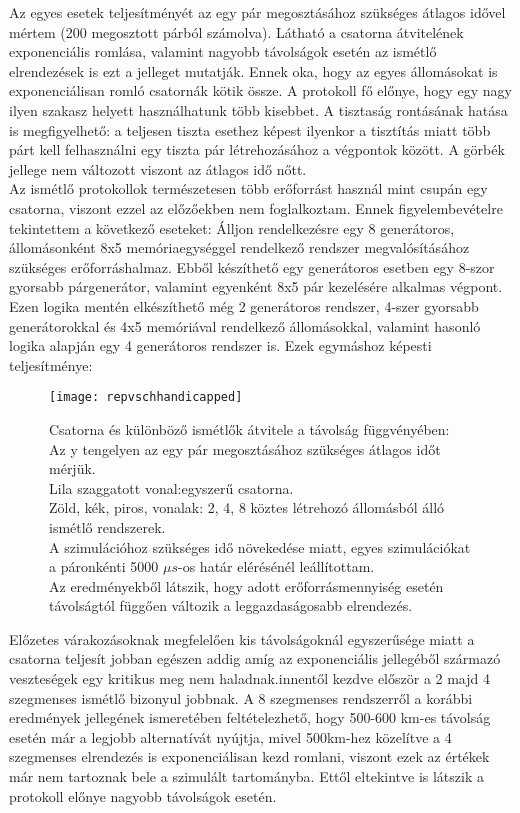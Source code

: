 Az egyes esetek teljesítményét az egy pár megosztásához szükséges átlagos idővel mértem (200 megosztott párból számolva).
Látható a csatorna átvitelének exponenciális romlása, valamint nagyobb távolságok esetén az ismétlő elrendezések is ezt a jelleget mutatják. Ennek oka, hogy az egyes állomásokat is exponenciálisan romló csatornák kötik össze. A protokoll fő előnye, hogy egy nagy ilyen szakasz helyett használhatunk több kisebbet. A tisztaság rontásának hatása is megfigyelhető: a teljesen tiszta esethez képest ilyenkor a tisztítás miatt több párt kell felhasználni egy tiszta pár létrehozásához a végpontok között. A görbék jellege nem változott viszont az átlagos idő nőtt.\\
Az ismétlő protokollok természetesen több erőforrást használ mint csupán egy csatorna, viszont ezzel az előzőekben nem foglalkoztam. Ennek figyelembevételre tekintettem a következő eseteket: Álljon rendelkezésre egy 8 generátoros, állomásonként 8x5 memóriaegységgel rendelkező rendszer megvalósításához szükséges erőforráshalmaz. Ebből készíthető egy generátoros esetben egy 8-szor gyorsabb párgenerátor, valamint egyenként 8x5 pár kezelésére alkalmas végpont. Ezen logika mentén elkészíthető még 2 generátoros rendszer, 4-szer gyorsabb generátorokkal és 4x5 memóriával rendelkező állomásokkal, valamint hasonló logika alapján egy 4 generátoros rendszer is. Ezek egymáshoz képesti teljesítménye:
\begin{figure}[H]
\centering
\texttt{[image: repvschhandicapped]}
\caption[Csatorna és ismétlők karakterisztikája 2]
{Csatorna és különböző ismétlők átvitele a távolság függvényében:\\
Az y tengelyen az egy pár megosztásához szükséges átlagos időt mérjük.\\
Lila szaggatott vonal:egyszerű csatorna.\\
Zöld, kék, piros, vonalak: 2, 4, 8 köztes létrehozó állomásból álló ismétlő rendszerek.\\
A szimulációhoz szükséges idő növekedése miatt, egyes szimulációkat a páronkénti 5000 $\mu s$-os határ elérésénél leállítottam.\\
Az eredményekből látszik, hogy adott erőforrásmennyiség esetén távolságtól függően változik a leggazdaságosabb elrendezés.
}
\end{figure}
Előzetes várakozásoknak megfelelően kis távolságoknál egyszerűsége miatt a csatorna teljesít jobban egészen addig amíg az exponenciális jellegéből származó  veszteségek egy kritikus meg nem haladnak.innentől kezdve először a 2 majd 4 szegmenses ismétlő bizonyul jobbnak. A 8 szegmenses rendszerről a korábbi eredmények jellegének ismeretében feltételezhető, hogy 500-600 km-es távolság esetén már a legjobb alternatívát nyújtja, mivel 500km-hez közelítve a 4 szegmenses elrendezés is exponenciálisan kezd romlani, viszont ezek az értékek már nem tartoznak bele a szimulált tartományba. Ettől eltekintve is látszik a protokoll előnye nagyobb távolságok esetén.

